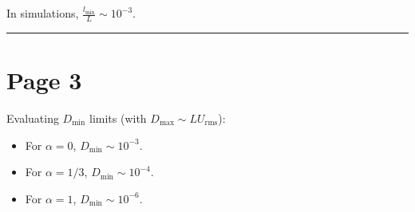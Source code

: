 \documentclass{article}
\begin{document}
In simulations, $\frac{l_{\text{min}}}{L} \sim 10^{-3}$.

\vspace{1em}
\hrule
\vspace{1em}

\section*{Page 3}

Evaluating $D_{\text{min}}$ limits (with $D_{\text{max}} \sim L U_{\text{rms}}$):
\begin{itemize}
    \item For $\alpha = 0$, $D_{\text{min}} \sim 10^{-3}$.
    \item For $\alpha = 1/3$, $D_{\text{min}} \sim 10^{-4}$.
    \item For $\alpha = 1$, $D_{\text{min}} \sim 10^{-6}$.
\end{itemize}
\end{document}
